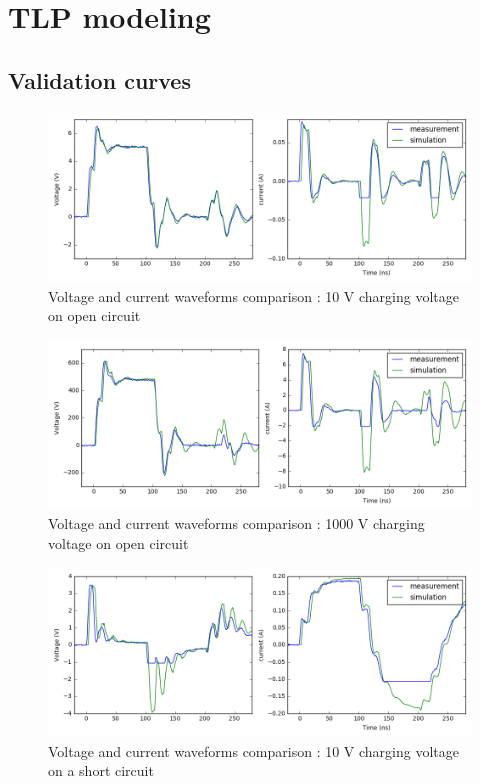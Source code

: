 \chapter{TLP modeling}
\section{Validation curves}
\label{apx:tlp-validation-curves}

\begin{figure}[!h]
  \centering
  \includegraphics[width=\textwidth]{src/2/figures/tlp_comparison_open_10V.png}
  \caption{Voltage and current waveforms comparison : 10 V charging voltage on open circuit}
  \label{fig:comparison-tlp-open-10v}
\end{figure}

\begin{figure}[!h]
  \centering
  \includegraphics[width=\textwidth]{src/2/figures/tlp_comparison_open_1000V.png}
  \caption{Voltage and current waveforms comparison : 1000 V charging voltage on open circuit}
  \label{fig:comparison-tlp-open-1000V}
\end{figure}

\begin{figure}[!h]
  \centering
  \includegraphics[width=\textwidth]{src/2/figures/tlp_comparison_short_10V.png}
  \caption{Voltage and current waveforms comparison : 10 V charging voltage on a short circuit}
  \label{fig:comparison-tlp-short-10V}
\end{figure}

